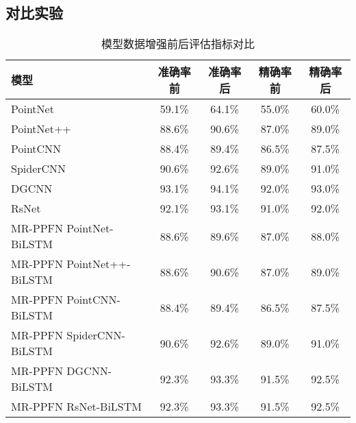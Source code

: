 \subsection{对比实验}
\begin{table}[htbp]
    \centering
    \caption{模型数据增强前后评估指标对比}
    \label{tab:model-comparison}
    \begin{tabular}{lcccc}
        \toprule
        \textbf{模型} & \textbf{准确率前} & \textbf{准确率后} & \textbf{精确率前} & \textbf{精确率后} \\
        \midrule
        PointNet & 59.1\% & 64.1\% & 55.0\% & 60.0\% \\
        PointNet++ & 88.6\% & 90.6\% & 87.0\% & 89.0\% \\
        PointCNN & 88.4\% & 89.4\% & 86.5\% & 87.5\% \\
        SpiderCNN & 90.6\% & 92.6\% & 89.0\% & 91.0\% \\
        DGCNN & 93.1\% & 94.1\% & 92.0\% & 93.0\% \\
        RsNet & 92.1\% & 93.1\% & 91.0\% & 92.0\% \\
        MR-PPFN PointNet-BiLSTM & 88.6\% & 89.6\% & 87.0\% & 88.0\% \\
        MR-PPFN PointNet++-BiLSTM & 88.6\% & 90.6\% & 87.0\% & 89.0\% \\
        MR-PPFN PointCNN-BiLSTM & 88.4\% & 89.4\% & 86.5\% & 87.5\% \\
        MR-PPFN SpiderCNN-BiLSTM & 90.6\% & 92.6\% & 89.0\% & 91.0\% \\
        MR-PPFN DGCNN-BiLSTM & 92.3\% & 93.3\% & 91.5\% & 92.5\% \\
        MR-PPFN RsNet-BiLSTM & 92.3\% & 93.3\% & 91.5\% & 92.5\% \\
        \bottomrule
    \end{tabular}
\end{table}
 


